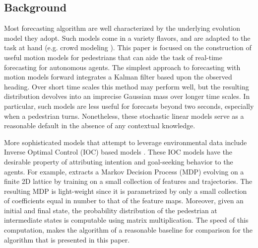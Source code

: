 \documentclass[letterpaper,10pt,conference]{ieeetran}
\begin{document}

\subsection{Background}
Most forecasting algorithm are well characterized by the underlying evolution model they adopt.
Such models come in a variety flavors, and are adapted to the task at hand (e.g. crowd modeling \cite{Helbing1992}).
This paper is focused on the construction of useful motion models for pedestrians that can aide the task of real-time forecasting for autonomous agents.
The simplest approach to forecasting with motion models forward integrates a Kalman filter based upon the observed heading.
Over short time scales this method may perform well, but the resulting distribution devolves into an imprecise Gaussian mass over longer time scales.
In particular, such models are less useful for forecasts beyond two seconds, especially when a pedestrian turns.
Nonetheless, these stochastic linear models serve as a reasonable default in the absence of any contextual knowledge.

More sophisticated models that attempt to leverage environmental data include Inverse Optimal Control (IOC) based models \cite{Ziebart2008,Ziebart2009,Kitani2012,Xie2013,Karasev2016}.
These IOC models have the desirable property of attributing intention and goal-seeking behavior to the agents.
For example, \cite{Kitani2012} extracts a Markov Decision Process (MDP) evolving on a finite 2D lattice by training on a small collection of features and trajectories.
The resulting MDP is light-weight since it is parametrized by only a small collection of coefficients equal in number to that of the feature maps.
Moreover, given an initial and final state, the probability distribution of the pedestrian at intermediate states is computable using matrix multiplication.
The speed of this computation, makes the algorithm of \cite{Kitani2012} a reasonable baseline for comparison for the algorithm that is presented in this paper.
\end{document}
